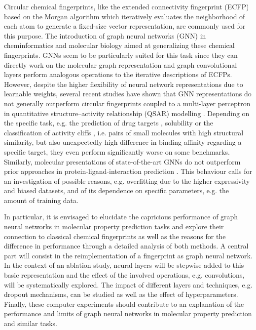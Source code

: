 Circular chemical fingerprints, like the extended connectivity fingerprint (ECFP) based on the Morgan algorithm which iteratively evaluates the neighborhood of each atom to generate a fixed-size vector representation, are commonly used for this purpose\cite{Rogers.2010}. The introduction of graph neural networks 
(GNN) in cheminformatics and molecular biology aimed at generalizing these chemical 
fingerprints\cite{Duvenaud.30.09.2015,Kearnes.2016}. GNNs seem to be particularly suited for this task since they can directly work on the molecular graph representation and graph convolutional layers perform analogous operations to the iterative descriptions of ECFPs. 
However, despite the higher flexibility of neural network representations due to learnable weights, several recent studies have shown that GNN representations do not generally outperform circular fingerprints coupled to a multi-layer perceptron in quantitative structure–activity relationship (QSAR) modelling \cite{Deng.2023,Menke.2021,Sabando.2021}. Depending on the specific task, e.g. the prediction of drug targets \cite{Stepisnik.2021}, solubility \cite{Mayr.2018} or the classification of activity cliffs \cite{Jiang.2021}, i.e. pairs of small molecules with high structural similarity, but also unexpectedly high difference in binding affinity regarding a specific target, they even perform significantly worse on some benchmarks. Similarly, molecular presentations of state-of-the-art GNNs do not outperform prior approaches in protein-ligand-interaction prediction \cite{Volkov.2022}. This behaviour calls for an investigation of possible reasons, e.g. overfitting due to the higher expressivity and biased datasets, and of its dependence on specific parameters, e.g. the amount of training data. 

In particular, it is envisaged to elucidate the capricious performance of graph neural 
networks in molecular property prediction tasks and explore their connection to classical chemical fingerprints as well as the reasons for the difference in performance through a detailed analysis of both methods. 
A central part will consist in the reimplementation of a fingerprint as graph neural network. In the context of an ablation study, neural layers will be stepwise added to this basic representation and the effect of the involved operations, e.g. convolutions, will be systematically explored. The impact of different layers and techniques, e.g. dropout mechanisms, can be studied as well as the effect of hyperparameters. Finally, these computer experiments should contribute to an explanation of the performance and limits of graph neural networks in molecular property prediction and similar tasks. 

